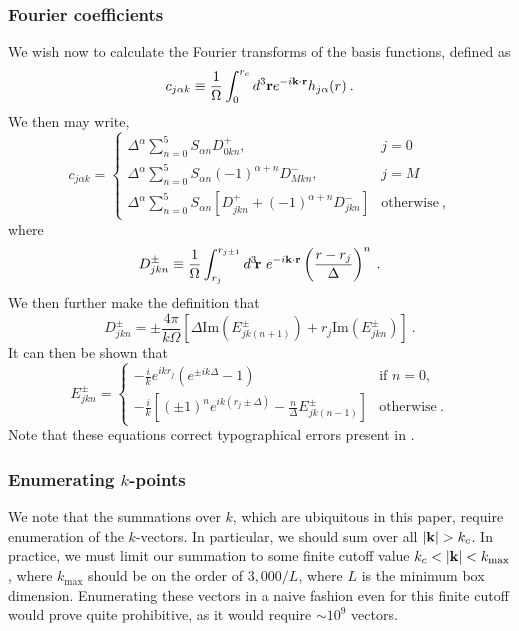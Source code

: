 \subsubsection*{Fourier coefficients}
We wish now to calculate the Fourier transforms of the basis
functions, defined as
\begin{equation}
c_{j\alpha k} \equiv \frac{1}{\Omega} \int_0^{r_c} d^3 \mathbf{r} 
e^{-i \mathbf{k} \cdot \mathbf{r}} h_{j\alpha}(r)\:.
\end{equation}
We then may write,
\begin{equation}
c_{j\alpha k} = 
\begin{cases}
\Delta^\alpha \sum_{n=0}^5 S_{\alpha n} D^+_{0 k n}, & j = 0 \\
\Delta^\alpha \sum_{n=0}^5 S_{\alpha n} (-1)^{\alpha+n} D^-_{M k n}, &
j = M \\
\Delta^\alpha \sum_{n=0}^5 S_{\alpha n} 
\left[ D^+_{j k n} + (-1)^{\alpha+n}D^-_{j k n} \right] & \text{otherwise}\:,
\end{cases}
\end{equation}
where
\begin{equation}
D^{\pm}_{jkn} \equiv \frac{1}{\Omega} \int_{r_j}^{r_{j\pm1}} d^3\!\vr \ 
e^{-i\vk \cdot \vr} \left( \frac{r-r_j}{\Delta}\right)^n\:.
\end{equation}
We then further make the definition that
\renewcommand{\Im}{\text{Im}}
\begin{equation}
D^{\pm}_{jkn} = \pm \frac{4\pi}{k \Omega} 
\left[ \Delta \Im \left(E^{\pm}_{jk(n+1)}\right) + 
r_j \Im \left(E^{\pm}_{jkn}\right)\right]\:.
\end{equation}
It can then be shown that 
\begin{equation}
E^{\pm}_{jkn} =
\begin{cases}
-\frac{i}{k} e^{ikr_j} \left( e^{\pm i k \Delta} - 1 \right) &
\text{if } n=0, \\
-\frac{i}{k} 
\left[ \left(\pm1\right)^n e^{i k (r_j \pm \Delta)} - \frac{n}{\Delta}
E^\pm_{jk(n-1)}  \right] & \text{otherwise}\:.
\end{cases}
\end{equation}
Note that these equations correct typographical errors present in \cite{Natoli1995}.
\subsubsection{Enumerating $k$-points}
We note that the summations over $k$, which are ubiquitous in
this paper, require enumeration of the $k$-vectors.  In particular, we
should sum over all $|\mathbf{k}| > k_c$.  In practice, we must limit our
summation to some finite cutoff value $k_c < |\mathbf{k}| < k_{\text{max}}$,
where $k_{\text{max}}$ should be on the order of $3,000/L$, where $L$ is the
minimum box dimension.  Enumerating these vectors in a naive fashion
even for this finite cutoff would prove quite prohibitive, as it would 
require $\sim10^9$ vectors.

